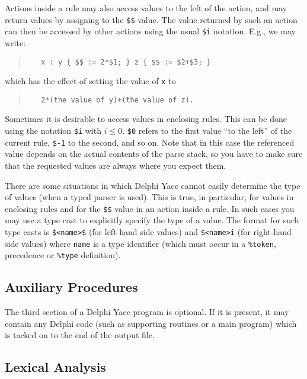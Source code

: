 \documentclass[a4paper]{article}
\begin{document}
Actions inside a rule may also access values to the left of the action,
and may return values by assigning to the \verb"$$" value. The value returned
by such an action can then be accessed by other actions using the usual
\verb"$i" notation. E.g., we may write:
\begin{quote}\begin{verbatim}
   x : y { $$ := 2*$1; } z { $$ := $2+$3; }
\end{verbatim}\end{quote}
which has the effect of setting the value of \verb"x" to
\begin{quote}\begin{verbatim}
   2*(the value of y)+(the value of z).
\end{verbatim}\end{quote}

Sometimes it is desirable to access values in enclosing rules. This can be
done using the notation \verb"$i" with $i\leq 0$. \verb"$0" refers to the
first value ``to the left'' of the current rule, \verb"$-1" to the second,
and so on. Note that in this case the referenced value depends on the actual
contents of the parse stack, so you have to make sure that the requested
values are always where you expect them.

There are some situations in which Delphi Yacc cannot easily determine the
type of values (when a typed parser is used). This is true, in particular,
for values in enclosing rules and for the \verb"$$" value in an action inside
a rule. In such cases you may use a type cast to explicitly specify the type
of a value. The format for such type casts is \verb"$<name>$" (for left-hand
side values) and \verb"$<name>i" (for right-hand side values) where
\verb"name" is a type identifier (which must occur in a \verb"%token",
precedence or \verb"%type" definition).

\subsection{Auxiliary Procedures}

The third section of a Delphi Yacc program is optional. If it is present, it
may contain any Delphi code (such as supporting routines or a main
program) which is tacked on to the end of the output file.

\subsection{Lexical Analysis}
\end{document}
